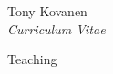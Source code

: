 \documentclass[10pt]{article}
\begin{document}
\begin{cv}{Tony Kovanen\\{\large \itshape Curriculum Vitae}}
\begin{cvlist}{Teaching}
\end{cvlist}	



%

%	
	

\end{cv}
\end{document}
